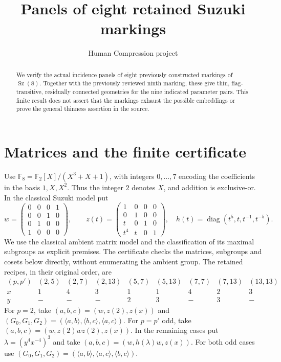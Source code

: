 \documentclass[11pt,a4paper]{article}
\title{Panels of eight retained Suzuki markings}
\author{Human Compression project}\date{}
\newcommand{\gen}[1]{\langle#1\rangle}
\newcommand{\Sz}{\operatorname{Sz}}
\begin{document}
\maketitle
\begin{abstract}
We verify the actual incidence panels of eight previously constructed
markings of $\Sz(8)$. Together with the previously reviewed ninth marking,
these give thin, flag-transitive, residually connected geometries for
the nine indicated parameter pairs. This finite result does not assert
that the markings exhaust the possible embeddings or prove the general
thinness assertion in the source.
\end{abstract}
\section{Matrices and the finite certificate}
Use $\mathbb F_8=\mathbb F_2[X]/(X^3+X+1)$, with integers $0,\ldots,7$
encoding the coefficients in the basis $1,X,X^2$. Thus the integer $2$
denotes $X$, and addition is exclusive-or. In the classical Suzuki model put
\[
 w=\begin{pmatrix}0&0&0&1\\0&0&1&0\\0&1&0&0\\1&0&0&0\end{pmatrix},\qquad
 z(t)=\begin{pmatrix}1&0&0&0\\0&1&0&0\\t&0&1&0\\t^4&t&0&1\end{pmatrix},
 \quad h(t)=\operatorname{diag}(t^5,t,t^{-1},t^{-5}).
\]
We use the classical ambient matrix model and the classification of its
maximal subgroups as explicit premises. The certificate checks the matrices,
subgroups and cosets below directly, without enumerating the ambient group.
The retained recipes, in their original order, are
\[
\begin{array}{c|rrrrrrrr}
(p,p')&(2,5)&(2,7)&(2,13)&(5,7)&(5,13)&(7,7)&(7,13)&(13,13)\\
x&1&4&3&1&1&4&2&3\\
y&-&-&-&2&3&-&3&-
\end{array}
\]
For $p=2$, take $(a,b,c)=(w,z(2),z(x))$ and
$(G_0,G_1,G_2)=(\gen{a,b},\gen{b,c},\gen{a,c})$.
For $p=p'$ odd, take $(a,b,c)=(w,z(2)wz(2),z(x))$.
In the remaining cases put $\lambda=(y^4x^{-4})^3$ and take
$(a,b,c)=(w,h(\lambda)w,z(x))$.
For both odd cases use
$(G_0,G_1,G_2)=(\gen{a,b},\gen{a,c},\gen{b,c})$.
\end{document}
